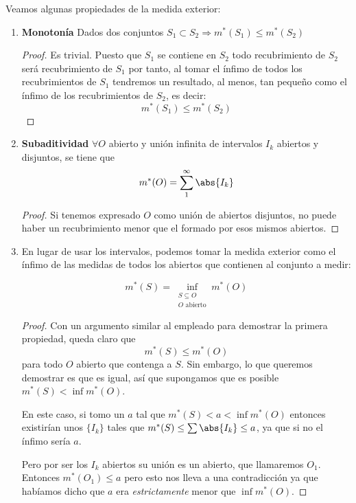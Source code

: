 \documentclass{apuntes}
\begin{document}
Veamos algunas propiedades de la medida exterior:
\begin{enumerate}
%
\item \textbf{Monotonía} Dados dos conjuntos $S_1 \subset S_2 \Rightarrow m^*(S_1) \leq m^*(S_2)$
\begin{proof}
Es trivial. Puesto que $S_1$ se contiene en $S_2$ todo recubrimiento de $S_2$ será recubrimiento de $S_1$ por tanto, al tomar el ínfimo de todos los recubrimientos de $S_1$ tendremos un resultado, al menos, tan pequeño como el ínfimo de los recubrimientos de $S_2$, es decir:
\[m^*(S_1) \leq m^*(S_2)\]
\end{proof}

%
\item \textbf{Subaditividad} $\forall O$ abierto y unión infinita de intervalos $I_k$ abiertos y disjuntos, se tiene que \[ m^*(O)=\sum_{1}^{\infty}\abs{I_k}\]
\begin{proof}
Si tenemos expresado $O$ como unión de abiertos disjuntos, no puede haber un recubrimiento menor que el formado por esos mismos abiertos.
\end{proof}

%
\item En lugar de usar los intervalos, podemos tomar la medida exterior como el ínfimo de las medidas de todos los abiertos que contienen al conjunto a medir:

\[ m^*(S) = \inf_{\substack{S⊆O \\ O \text{ abierto}}} m^*(O) \]

\begin{proof}
Con un argumento similar al empleado para demostrar la primera propiedad, queda claro que
\[ m^*(S) \leq m^*(O) \] para todo $O$ abierto que contenga a $S$. Sin embargo, lo que queremos demostrar es que es igual, así que supongamos que es posible $m^*(S) < \inf m^*(O)$.

En este caso, si tomo un $a$ tal que $ m^*(S) < a < \inf m^*(O)$ entonces existirían unos $\lbrace I_k\rbrace$ tales que $m^*(S) \leq \sum \abs{I_k} \leq a$, ya que si no el ínfimo sería $a$.

Pero por ser los $I_k$ abiertos su unión es un abierto, que llamaremos $O_1$. Entonces $m^*(O_1) \leq a$ pero esto nos lleva a una contradicción ya que habíamos dicho que $a$ era \textit{estrictamente} menor que $\inf m^*(O)$.


\end{proof}
\end{enumerate}
\end{document}

